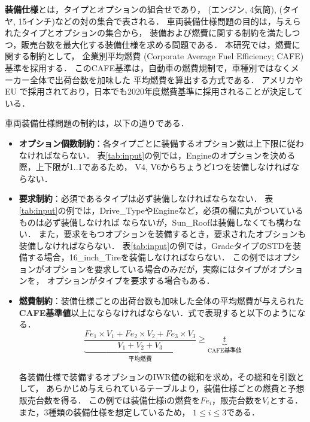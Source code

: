 \textbf{装備仕様}とは，タイプとオプションの組合せであり，
(エンジン, 4気筒), (タイヤ, 15インチ)などの対の集合で表される．
車両装備仕様問題の目的は，与えられたタイプとオプションの集合から，
装備および燃費に関する制約を満たしつつ，販売台数を最大化する装備仕様を求める問題である．
本研究では，燃費に関する制約として，
企業別平均燃費 (Corporate Average Fuel Efficiency; CAFE)基準を採用する．
このCAFE基準は，自動車の燃費規制で，車種別ではなくメーカー全体で出荷台数を加味した
平均燃費を算出する方式である．
アメリカや EU で採用されており，日本でも2020年度燃費基準に採用されることが決定している．

車両装備仕様問題の制約は，以下の通りである．
\begin{itemize}
	\item \textbf{オプション個数制約}：各タイプごとに装備するオプション数は上下限に従わなければならない．
	表\ref{tab:input}の例では，Engineのオプションを決める際，上下限が1..1であるため，
	V4, V6からちょうど1つを装備しなければならない．
	\item \textbf{要求制約}：必須であるタイプは必ず装備しなければならなない．
	表\ref{tab:input}の例では，Drive\_TypeやEngineなど，必須の欄に丸がついているものは必ず装備しなければ
	ならないが，Sun\_Roofは装備しなくても構わない．
	また，要求をもつオプションを装備するとき，要求されたオプションも装備しなければならない．
	表\ref{tab:input}の例では，GradeタイプのSTDを装備する場合，16\_inch\_Tireを装備しなければならない．
	この例ではオプションがオプションを要求している場合のみだが，実際にはタイプがオプションを，
	オプションがタイプを要求する場合もある．
	\item \textbf{燃費制約}：装備仕様ごとの出荷台数も加味した全体の平均燃費が与えられた
	\textbf{CAFE基準値}以上にならなければならない．式で表現すると以下のようになる．
	 \begin{equation}
	 \label{eq:cafe1} 
 	\underbrace{
		\frac{Fe_{1} \times V_1 + Fe_{2} \times V_2 + Fe_{3} \times V_3 }{V_1 + V_2 + V_3}
	}_{\mbox{平均燃費}}
	\geq 
	\underbrace{t}_{\mbox{CAFE基準値}}
	\end{equation}

	各装備仕様で装備するオプションのIWR値の総和を求め，その総和を引数として，
	あらかじめ与えられているテーブルより，装備仕様ごとの燃費と予想販売台数を得る．
	この例では装備仕様iの燃費を$Fe_i$，販売台数を$V_i$とする．また，3種類の装備仕様を想定しているため，
	$1 \leq i \leq 3$である．
\end{itemize}


